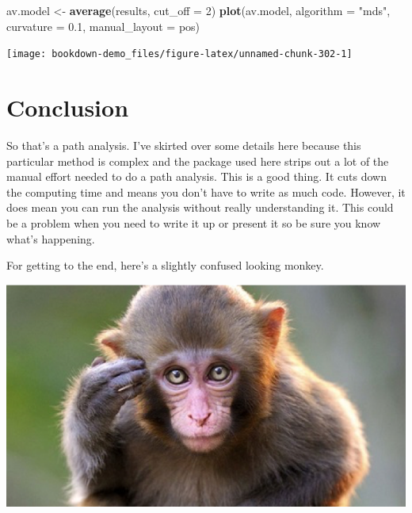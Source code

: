 \documentclass[
]{book}
\newenvironment{Shaded}{\begin{snugshade}}{\end{snugshade}}
\newcommand{\DataTypeTok}[1]{\textcolor[rgb]{0.13,0.29,0.53}{#1}}
\newcommand{\DecValTok}[1]{\textcolor[rgb]{0.00,0.00,0.81}{#1}}
\newcommand{\FloatTok}[1]{\textcolor[rgb]{0.00,0.00,0.81}{#1}}
\newcommand{\KeywordTok}[1]{\textcolor[rgb]{0.13,0.29,0.53}{\textbf{#1}}}
\newcommand{\NormalTok}[1]{#1}
\newcommand{\StringTok}[1]{\textcolor[rgb]{0.31,0.60,0.02}{#1}}
\begin{document}
\begin{Shaded}
\begin{Highlighting}[]
\NormalTok{av.model \textless{}{-}}\StringTok{ }\KeywordTok{average}\NormalTok{(results, }\DataTypeTok{cut\_off =} \DecValTok{2}\NormalTok{)}
\KeywordTok{plot}\NormalTok{(av.model, }\DataTypeTok{algorithm =} \StringTok{"mds"}\NormalTok{, }\DataTypeTok{curvature =} \FloatTok{0.1}\NormalTok{, }\DataTypeTok{manual\_layout =}\NormalTok{ pos)}
\end{Highlighting}
\end{Shaded}

\begin{center}\texttt{[image: bookdown-demo\_files/figure-latex/unnamed-chunk-302-1]} \end{center}

\hypertarget{conclusion-1}{%
\section{Conclusion}\label{conclusion-1}}

So that's a path analysis. I've skirted over some details here because this particular method is complex and the package used here strips out a lot of the manual effort needed to do a path analysis. This is a good thing. It cuts down the computing time and means you don't have to write as much code. However, it does mean you can run the analysis without really understanding it. This could be a problem when you need to write it up or present it so be sure you know what's happening.

For getting to the end, here's a slightly confused looking monkey.

\begin{center}\includegraphics[width=10.1in]{Images/monkey} \end{center}
\end{document}
